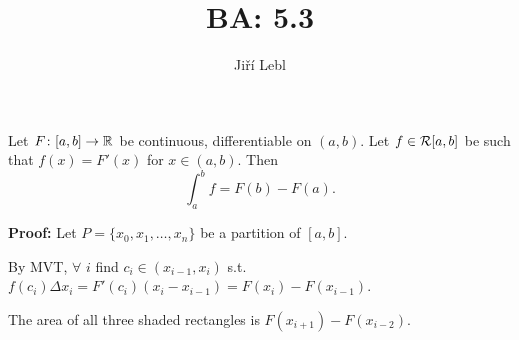 \documentclass[10pt,aspectratio=169]{beamer}
\author{Ji\v{r}\'i Lebl}
\institute[OSU]{%
Departemento pri Matematiko de Oklahoma {\^S}tata Universitato}
\title{BA: 5.3}
\date{}
\begin{document}
\begin{frame}
\titlepage
\end{frame}

\begin{frame}
\begin{theorem}
Let $F \colon [a,b] \to {\mathbb{R}}$ be continuous, differentiable
on $(a,b)$.
\pause
Let $f \in {\mathcal{R}}[a,b]$ be such that $f(x) = F'(x)$ for $x \in
(a,b)$.
\pause
Then
\vspace*{-12pt}
\begin{equation*}
\int_a^b f = F(b)-F(a) .
\end{equation*}
\end{theorem}

\pause
\textbf{Proof:}
Let $P = \{ x_0, x_1, \ldots, x_n \}$ be a partition of $[a,b]$.

\pause
By MVT, $\forall$ $i$ find
$c_i \in (x_{i-1},x_i)$ s.t.
~$f(c_i) \Delta x_i = F'(c_i) (x_i - x_{i-1}) = F(x_i) - F(x_{i-1})$.

\pause
\medskip

\begin{center}
\end{center}

\pause
The area of all
three shaded rectangles is $F(x_{i+1})-F(x_{i-2})$.

\end{frame}
\end{document}
